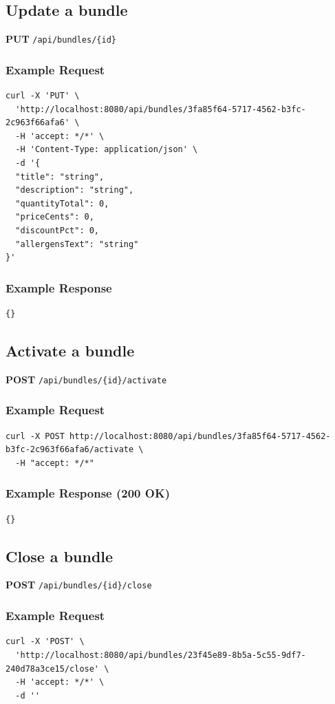\documentclass[a4paper,11pt]{article}
\begin{document}
\subsection{Update a bundle}
\textbf{PUT} \texttt{/api/bundles/\{id\}}
\subsubsection*{Example Request}
\begin{lstlisting}
curl -X 'PUT' \
  'http://localhost:8080/api/bundles/3fa85f64-5717-4562-b3fc-2c963f66afa6' \
  -H 'accept: */*' \
  -H 'Content-Type: application/json' \
  -d '{
  "title": "string",
  "description": "string",
  "quantityTotal": 0,
  "priceCents": 0,
  "discountPct": 0,
  "allergensText": "string"
}'
\end{lstlisting}

\subsubsection*{Example Response}
\begin{lstlisting}
{}
\end{lstlisting}

\subsection{Activate a bundle}
\textbf{POST} \texttt{/api/bundles/\{id\}/activate}
\subsubsection*{Example Request}
\begin{lstlisting}
curl -X POST http://localhost:8080/api/bundles/3fa85f64-5717-4562-b3fc-2c963f66afa6/activate \
  -H "accept: */*"
\end{lstlisting}

\subsubsection*{Example Response (200 OK)}
\begin{lstlisting}
{}
\end{lstlisting}

\subsection{Close a bundle}
\textbf{POST} \texttt{/api/bundles/\{id\}/close}
\subsubsection*{Example Request}
\begin{lstlisting}
curl -X 'POST' \
  'http://localhost:8080/api/bundles/23f45e89-8b5a-5c55-9df7-240d78a3ce15/close' \
  -H 'accept: */*' \
  -d ''
\end{lstlisting}
\end{document}

